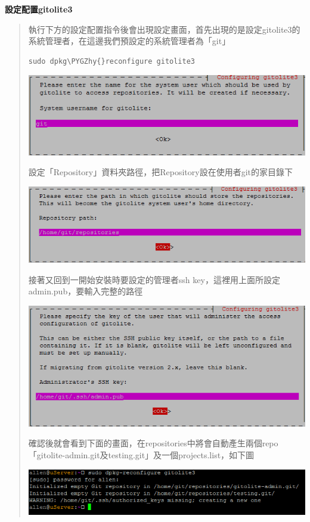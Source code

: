 \documentclass[letterpaper,10pt,english]{sphinxmanual}
\def\PYGZhy{\char`\-}
\begin{document}
\textbf{設定配置gitolite3}
\begin{quote}

執行下方的設定配置指令後會出現設定畫面，首先出現的是設定gitolite3的系統管理者，在這邊我們預設定的系統管理者為「git」

\begin{Verbatim}[commandchars=\\\{\}]
sudo dpkg\PYGZhy{}reconfigure gitolite3
\end{Verbatim}

\includegraphics{gitolite3-username.png}

設定「Repository」資料夾路徑，把Repository設在使用者git的家目錄下

\includegraphics{gitolite3-repository-path.png}

接著又回到一開始安裝時要設定的管理者ssh key，這裡用上面所設定admin.pub，要輸入完整的路徑

\includegraphics{gitolite3-admin-sshkey.png}

確認後就會看到下面的畫面，在repositories中將會自動產生兩個repo「gitolite-admin.git及testing.git」及一個projects.list，如下圖

\includegraphics{gitolite3-cmd.png}


\end{quote}
\end{document}
